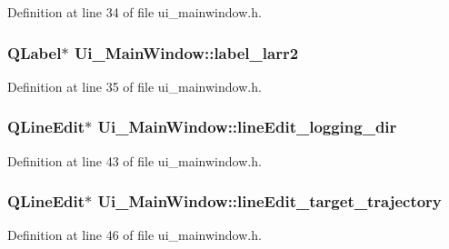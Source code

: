 Definition at line 34 of file ui\+\_\+mainwindow.\+h.

\subsubsection[{\texorpdfstring{label\+\_\+larr2}{label_larr2}}]{\setlength{\rightskip}{0pt plus 5cm}Q\+Label$\ast$ Ui\+\_\+\+Main\+Window\+::label\+\_\+larr2}\hypertarget{class_ui___main_window_a06fc1a01ac3ba3d4d1f75a0e8ab06684}{}\label{class_ui___main_window_a06fc1a01ac3ba3d4d1f75a0e8ab06684}


Definition at line 35 of file ui\+\_\+mainwindow.\+h.

\subsubsection[{\texorpdfstring{line\+Edit\+\_\+logging\+\_\+dir}{lineEdit_logging_dir}}]{\setlength{\rightskip}{0pt plus 5cm}Q\+Line\+Edit$\ast$ Ui\+\_\+\+Main\+Window\+::line\+Edit\+\_\+logging\+\_\+dir}\hypertarget{class_ui___main_window_a7ab71242b81ef9d13f83c16f6328f35d}{}\label{class_ui___main_window_a7ab71242b81ef9d13f83c16f6328f35d}


Definition at line 43 of file ui\+\_\+mainwindow.\+h.

\subsubsection[{\texorpdfstring{line\+Edit\+\_\+target\+\_\+trajectory}{lineEdit_target_trajectory}}]{\setlength{\rightskip}{0pt plus 5cm}Q\+Line\+Edit$\ast$ Ui\+\_\+\+Main\+Window\+::line\+Edit\+\_\+target\+\_\+trajectory}\hypertarget{class_ui___main_window_a4a75bfb754049f89fccef822cad712d6}{}\label{class_ui___main_window_a4a75bfb754049f89fccef822cad712d6}


Definition at line 46 of file ui\+\_\+mainwindow.\+h.

